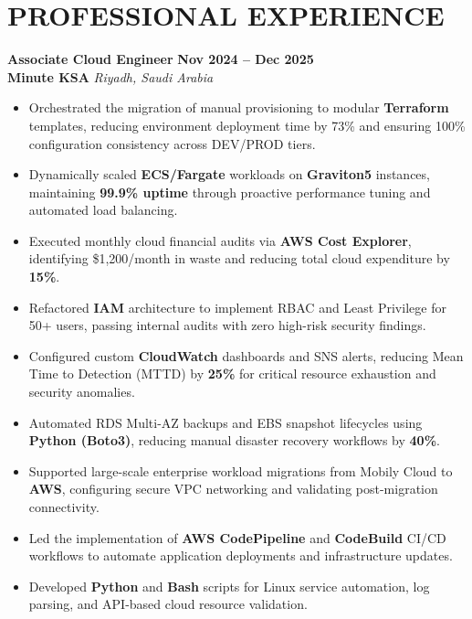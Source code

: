 \documentclass[10pt,a4paper]{article}
\newcommand{\jobheading}[4]{
  \vspace{1.5ex}\noindent
  {\large\textbf{\color{darkteal}#1}} \hfill \textbf{\color{textmain}#2} \\[0.3ex]
  \textbf{\color{textdark}#3} \hfill \textit{\color{textmain}#4} \vspace{0.8ex}
}
\begin{document}
\section*{PROFESSIONAL EXPERIENCE}

\jobheading{Associate Cloud Engineer}{Nov 2024 – Dec 2025}{Minute KSA}{Riyadh, Saudi Arabia}
\begin{itemize}[label={\color{teal}\textbullet},leftmargin=*,itemsep=3pt,parsep=1pt,topsep=1pt]
    \item Orchestrated the migration of manual provisioning to modular \textbf{Terraform} templates, reducing environment deployment time by 73\% and ensuring 100\% configuration consistency across DEV/PROD tiers.
    \item Dynamically scaled \textbf{ECS/Fargate} workloads on \textbf{Graviton5} instances, maintaining \textbf{99.9\% uptime} through proactive performance tuning and automated load balancing.
    \item Executed monthly cloud financial audits via \textbf{AWS Cost Explorer}, identifying \$1,200/month in waste and reducing total cloud expenditure by \textbf{15\%}.
    \item Refactored \textbf{IAM} architecture to implement RBAC and Least Privilege for 50+ users, passing internal audits with zero high-risk security findings.
    \item Configured custom \textbf{CloudWatch} dashboards and SNS alerts, reducing Mean Time to Detection (MTTD) by \textbf{25\%} for critical resource exhaustion and security anomalies.
    \item Automated RDS Multi-AZ backups and EBS snapshot lifecycles using \textbf{Python (Boto3)}, reducing manual disaster recovery workflows by \textbf{40\%}.
    \item Supported large-scale enterprise workload migrations from Mobily Cloud to \textbf{AWS}, configuring secure VPC networking and validating post-migration connectivity.
    \item Led the implementation of \textbf{AWS CodePipeline} and \textbf{CodeBuild} CI/CD workflows to automate application deployments and infrastructure updates.
    \item Developed \textbf{Python} and \textbf{Bash} scripts for Linux service automation, log parsing, and API-based cloud resource validation.
\end{itemize}
\end{document}

